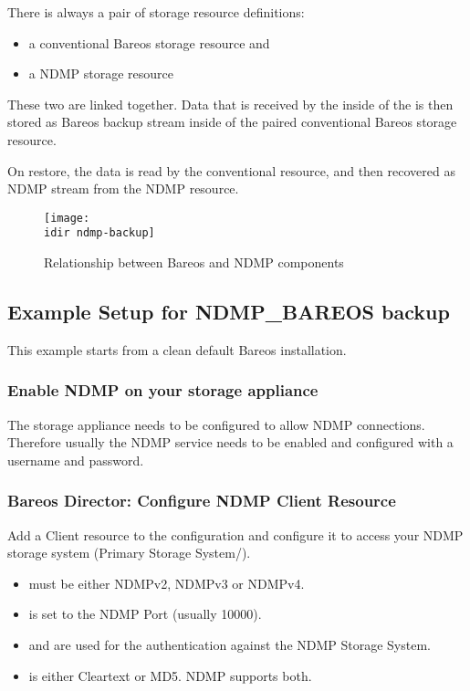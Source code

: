 There is always a pair of storage resource definitions:
\begin{itemize}
    \item a conventional Bareos storage resource and
    \item a NDMP storage resource
\end{itemize}

These two are linked together.
Data that is received by the \TapeAgent inside of the \bareosSd is then stored as Bareos backup stream inside of the paired conventional Bareos storage resource.

On restore, the data is read by the conventional resource, and then recovered as NDMP stream from the NDMP resource.

\begin{figure}[htbp]
\centering
\texttt{[image: \\idir ndmp-backup]}
\caption{Relationship between Bareos and NDMP components}
\end{figure}%


\subsection{Example Setup for NDMP\_BAREOS backup}

This example starts from a clean default Bareos installation.

\subsubsection{Enable NDMP on your storage appliance}

The storage appliance needs to be configured to allow NDMP connections. Therefore  usually the
NDMP service needs to be enabled and configured with a username and password.

\subsubsection{Bareos Director: Configure NDMP Client Resource}

Add a Client resource to the \bareosDir configuration
and configure it to access your NDMP storage system (Primary Storage System/\DataAgent).

\begin{itemize}
    \item {} must be either NDMPv2, NDMPv3 or NDMPv4.
    \item {} is set to the NDMP Port (usually 10000).
    \item {} and  are used for the authentication against the NDMP Storage System.
    \item {} is either Cleartext or MD5. NDMP supports both.
\end{itemize}

